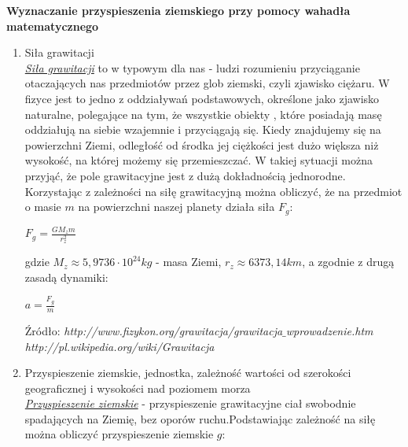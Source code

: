 \documentclass[7pt]{article}
\begin{document}
\begin{center}
\LARGE {\textbf{Wyznaczanie przyspieszenia ziemskiego przy pomocy wahadła matematycznego}}
\end{center}
\begin{enumerate}
\item \large {Siła grawitacji} \\
\textit{\underline{Siła grawitacji}} to w typowym dla nas - ludzi rozumieniu przyciąganie otaczających nas przedmiotów przez glob ziemski, czyli zjawisko ciężaru. W fizyce jest to jedno z oddziaływań podstawowych, określone jako zjawisko naturalne, polegające na tym, że wszystkie obiekty , które posiadają masę oddziałują na siebie wzajemnie i przyciągają się. Kiedy znajdujemy się na powierzchni Ziemi, odległość od środka jej ciężkości jest dużo większa niż wysokość, na której możemy się przemieszczać. W takiej sytuacji można przyjąć, że pole grawitacyjne jest z dużą dokładnością jednorodne. \\
Korzystając z zależności na siłę grawitacyjną można obliczyć, że na przedmiot o masie $m$ na powierzchni naszej planety działa siła $F_g$: \\
\begin{center}
\begin{Large}
$F_g=\frac{GM_z m}{r_z^2}$
\end{Large}
\end{center}
\begin{small}
gdzie $M_z \approx 5,9736 \cdot 10^{24} kg$ - masa Ziemi, $r_z \approx 6373,14 km$, a zgodnie z drugą zasadą dynamiki:
\end{small}
\begin{Large}
\begin{center}
$a=\frac{F_g}{m}$
\end{center}
\end{Large}
\begin{flushright}
\begin{scriptsize}
Źródło: \textit{http://www.fizykon.org/grawitacja/grawitacja$\_$wprowadzenie.htm} \\
\textit{http://pl.wikipedia.org/wiki/Grawitacja}
\end{scriptsize}
\end{flushright}
\item \large {Przyspieszenie ziemskie, jednostka, zależność wartości od szerokości geograficznej i wysokości nad poziomem morza} \\
\textit{\underline{Przyspieszenie ziemskie}} - przyspieszenie grawitacyjne ciał swobodnie spadających na Ziemię, bez oporów ruchu.Podstawiając zależność na siłę można obliczyć przyspieszenie ziemskie $g$:

\end{enumerate}
\end{document}
